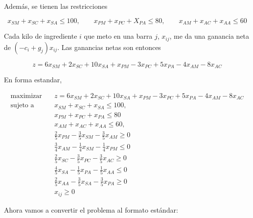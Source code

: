 \documentclass[12pt]{article}
\begin{document}
Además, se tienen las restricciones 

\begin{equation*}
    x_{SM} + x_{SC} + x_{SA} \leq 100, \qquad x_{PM} + x_{PC} + X_{PA} \leq 80,
    \qquad x_{AM} + x_{AC} + x_{A A } \leq 60
\end{equation*}

Cada kilo de ingrediente $i$ que meto en una barra $j$, $x_{ij}$, me da una
ganancia neta de $( -c_i + g_j )x_{ij}$. Las ganancias netas son entonces

\begin{equation*}
z = 6x_{SM} + 2x_{SC} + 10x_{SA} + x_{PM} - 3x_{PC} + 5x_{PA} - 4x_{AM} - 8x_{AC}
\end{equation*}

En forma estandar, 

\[
\begin{aligned}
\text{maximizar} \quad &  z = 6x_{SM} + 2x_{SC} + 10x_{SA} + x_{PM} - 3x_{PC} +
5x_{PA} - 4x_{AM} - 8x_{AC}\\
\text{sujeto a} \quad
                      & x_{SM} + x_{SC} + x_{SA} \leq 100, \\
& x_{PM} + x_{PC} + x_{PA} \leq 80 \\
& x_{AM} + x_{AC} + x_{AA} \leq 60, \\
& \frac{2}{5}x_{PM} - \frac{3}{5} x_{SM} - \frac{3}{5}x_{AM} \geq 0\\ 
& \frac{3}{4} x_{AM} - \frac{1}{4} x_{SM} - \frac{1}{4} x_{PM} \leq 0 \\ 
& \frac{2}{5} x_{SC} - \frac{3}{5}x_{PC} - \frac{3}{5} x_{AC} \geq 0 \\ 
&\frac{4}{5} x_{SA} - \frac{1}{5} x_{PA} -\frac{1}{5}x_{AA} \leq 0 \\ 
&\frac{2}{5} x_{AA} - \frac{3}{5} x_{SA} - \frac{3}{5} x_{PA} \geq 0\\ 
&x_{ij} \geq 0
\end{aligned}
\]

Ahora vamos a convertir el problema al formato estándar: 
\end{document}
